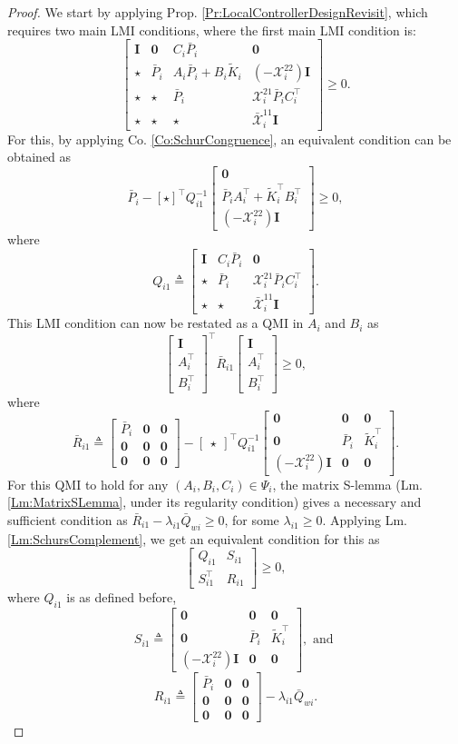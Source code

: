 \documentclass[letterpaper, 10 pt, conference]{ieeeconf}%
\newcommand{\T}{\top}
\newcommand{\I}{\mathbf{I}}
\newcommand{\0}{\mathbf{0}}
\newcommand{\X}{\mathcal{X}}
\newcommand{\x}{{\scriptstyle \X}}
\newcommand{\bm}[1]{\begin{bmatrix}#1\end{bmatrix}}
\begin{document}
\begin{proof}
We start by applying Prop. \ref{Pr:LocalControllerDesignRevisit}, which requires two main LMI conditions, where the first main LMI condition is:
$$
\bm{ 
\I & \0 & C_i\bar{P}_i & \0 \\
\star & \bar{P}_i & A_i\bar{P}_i+B_i\tilde{K}_i & (-\x_i^{22})\I \\
\star & \star & \bar{P}_i  & \x^{21}_i \bar{P}_iC_i^\T \\
\star & \star & \star & \bar{\x}^{11}_i\I 
} \geq 0.
$$
For this, by applying Co. \ref{Co:SchurCongruence}, an equivalent condition can be obtained as
$$
\bar{P}_i - [\star]^\T Q_{i1}^{-1} \bm{\0 \\ \bar{P}_i A_i^\T + \tilde{K}_i^\T B_i^\T \\ (-\x_i^{22})\I} \geq 0,
$$
where
$$
Q_{i1} \triangleq 
\bm{ 
\I & C_i\bar{P}_i & \0 \\
\star & \bar{P}_i  & \x^{21}_i \bar{P}_iC_i^\T \\
\star & \star & \bar{\x}^{11}_i\I 
}.
$$
This LMI condition can now be restated as a QMI in $A_i$ and $B_i$ as
$$
\bm{\I \\ A_i^\T \\ B_i^\T}^\T  \bar{R}_{i1} \bm{\I \\ A_i^\T \\ B_i^\T} \geq 0,
$$
where 
$$
\bar{R}_{i1} \triangleq 
\bm{\bar{P}_i & \0 & \0 \\ \0 & \0 & \0 \\ \0 & \0 & \0 } - \bm{\star}^\T Q_{i1}^{-1} \bm{\0 & \0 & \0 \\ \0 & \bar{P}_i & \tilde{K}_i^\T \\ (-\x_i^{22})\I & \0 & \0}.
$$
For this QMI to hold for any $(A_i,B_i,C_i)\in\Psi_i$, the matrix S-lemma (Lm. \ref{Lm:MatrixSLemma}, under its regularity condition) gives a necessary and sufficient condition as
$\bar{R}_{i1} - \lambda_{i1} \bar{Q}_{wi} \geq 0$, for some $\lambda_{i1} \geq 0$. Applying Lm. \ref{Lm:SchursComplement}, we get an equivalent condition for this as 
$$
\bm{Q_{i1} & S_{i1} \\ S_{i1}^\T & R_{i1}} \geq 0,
$$
where $Q_{i1}$ is as defined before, 
$$
S_{i1} \triangleq \bm{\0 & \0 & \0 \\ \0 & \bar{P}_i & \tilde{K}_i^\T \\ (-\x_i^{22})\I & \0 & \0}, \mbox{ and }
$$
$$
R_{i1} \triangleq \bm{\bar{P}_i & \0 & \0 \\ \0 & \0 & \0 \\ \0 & \0 & \0 } - \lambda_{i1} \bar{Q}_{wi}.
$$
\end{proof}
\end{document}
